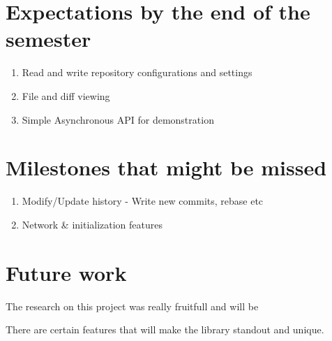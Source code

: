 \section{Expectations by the end of the semester}

\begin{enumerate}

	\item Read and write repository configurations and settings
    \item File and diff viewing
    \item Simple Asynchronous API for demonstration

\end{enumerate}




\section{Milestones that  might be missed}


\begin{enumerate}

	\item Modify/Update history - Write new commits, rebase etc
    \item Network \& initialization features

\end{enumerate}

\section{Future work}

The research on this project was really fruitfull and will be

There are certain features that will make the library standout and unique.
